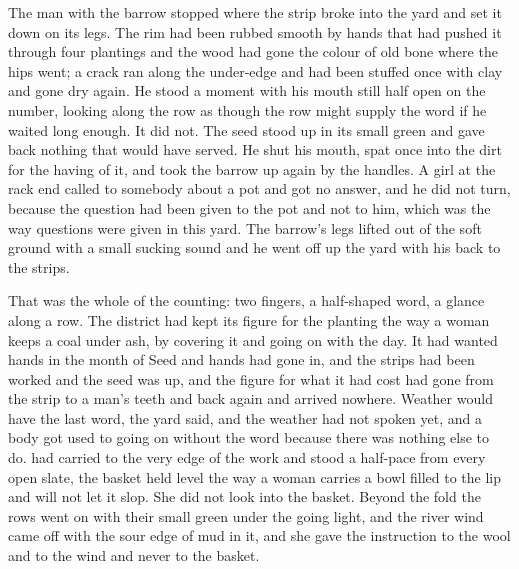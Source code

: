 The man with the barrow stopped where the strip broke into the yard and set it down on its legs. The rim had been rubbed smooth by hands that had pushed it through four plantings and the wood had gone the colour of old bone where the hips went; a crack ran along the under-edge and had been stuffed once with clay and gone dry again. He stood a moment with his mouth still half open on the number, looking along the row as though the row might supply the word if he waited long enough. It did not. The seed stood up in its small green and gave back nothing that would have served. He shut his mouth, spat once into the dirt for the having of it, and took the barrow up again by the handles. A girl at the rack end called to somebody about a pot and got no answer, and he did not turn, because the question had been given to the pot and not to him, which was the way questions were given in this yard. The barrow's legs lifted out of the soft ground with a small sucking sound and he went off up the yard with his back to the strips.

That was the whole of the counting: two fingers, a half-shaped word, a glance along a row. The district had kept its figure for the planting the way a woman keeps a coal under ash, by covering it and going on with the day. It had wanted hands in the month of Seed and hands had gone in, and the strips had been worked and the seed was up, and the figure for what it had cost had gone from the strip to a man's teeth and back again and arrived nowhere. Weather would have the last word, the yard said, and the weather had not spoken yet, and a body got used to going on without the word because there was nothing else to do.  had carried  to the very edge of the work and stood a half-pace from every open slate, the basket held level the way a woman carries a bowl filled to the lip and will not let it slop. She did not look into the basket. Beyond the fold the rows went on with their small green under the going light, and the river wind came off  with the sour edge of mud in it, and she gave the instruction to the wool and to the wind and never to the basket.

